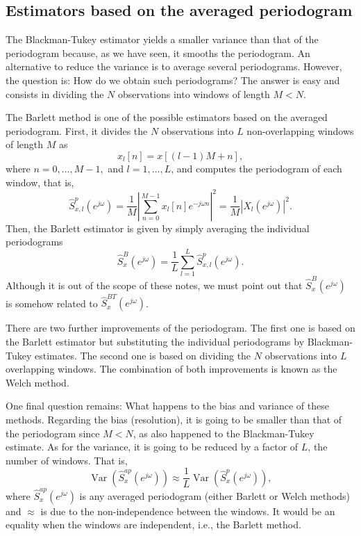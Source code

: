 \subsection{Estimators based on the averaged periodogram}

The Blackman-Tukey estimator yields a smaller variance than that of the periodogram because, as we have seen, it smooths the periodogram. An alternative to reduce the variance is to average several periodograms. However, the question is: How do we obtain such periodograms? The answer is easy and consists in dividing the $N$ observations into windows of length $M < N$. 

The Barlett method is one of the possible estimators based on the averaged periodogram. First, it divides the $N$ observations into $L$ non-overlapping windows of length $M$ as
\begin{equation*}
	x_l[n] = x[(l-1) M + n],
\end{equation*}
where $n = 0, \ldots, M-1,$ and $l = 1, \ldots, L$, and computes the periodogram of each window, that is,
\begin{equation*}
\hat{S}_{x,l}^{p}(e^{j \omega}) = \frac{1}{M} \left| \sum_{n = 0}^{M-1} x_l[n] e^{-j \omega n} \right|^2 = \frac{1}{M} \left| X_l(e^{j \omega}) \right|^2.
\end{equation*}
Then, the Barlett estimator is given by simply averaging the individual periodograms
\begin{equation*}
\hat{S}_{x}^{B}(e^{j \omega}) = \frac{1}{L} \sum_{l = 1}^{L}\hat{S}_{x,l}^{p}(e^{j \omega}).
\end{equation*}
Although it is out of the scope of these notes, we must point out that $\hat{S}_{x}^{B}(e^{j \omega})$ is somehow related to $\hat{S}_{x}^{BT}(e^{j \omega})$.

There are two further improvements of the periodogram. The first one is based on the Barlett estimator but substituting the individual periodograms by Blackman-Tukey estimates. The second one is based on dividing the $N$ observations into $L$ overlapping windows. The combination of both improvements is known as the Welch method.

One final question remains: What happens to the bias and variance of these methods. Regarding the bias (resolution), it is going to be smaller than that of the periodogram since $M < N$, as also happened to the Blackman-Tukey estimate. As for the variance, it is going to be reduced by a factor of $L$, the number of windows. That is,
\begin{equation*}
\mathop{Var}\left(\hat{S}_x^{ap}(e^{j \omega})\right) \approx \frac{1}{L} \mathop{Var}\left(\hat{S}_x^{p}(e^{j \omega})\right),
\end{equation*}
where $\hat{S}_x^{ap}(e^{j \omega})$ is any averaged periodogram (either Barlett or Welch methods) and $\approx$ is due to the non-independence between the windows. It would be an equality when the windows are independent, i.e., the Barlett method.

